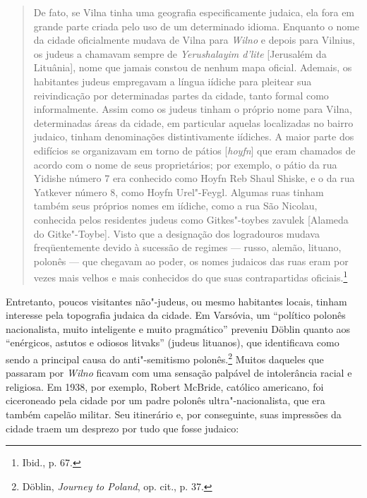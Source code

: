 \begin{quote}
De fato, se Vilna tinha uma geografia especificamente judaica, ela fora
em grande parte criada pelo uso de um determinado idioma. Enquanto o
nome da cidade oficialmente mudava de Vilna para \textit{Wilno} e depois para
Vilnius, os judeus a chamavam sempre de \textit{Yerushalayim d'lite}
{[}Jerusalém da Lituânia{]}, nome que jamais constou de nenhum mapa
oficial. Ademais, os habitantes judeus empregavam a língua iídiche para
pleitear sua reivindicação por determinadas partes da cidade, tanto
formal como informalmente. Assim como os judeus tinham o próprio nome
para Vilna, determinadas áreas da cidade, em particular aquelas
localizadas no bairro judaico, tinham denominações distintivamente
iídiches. A maior parte dos edifícios se organizavam em torno de pátios
{[}\textit{hoyfn}{]} que eram chamados de acordo com o nome de seus
proprietários; por exemplo, o pátio da rua Yidishe número 7 era
conhecido como Hoyfn Reb Shaul Shiske, e o da rua Yatkever número 8,
como Hoyfn Urel"-Feygl. Algumas ruas tinham também seus próprios nomes em
iídiche, como a rua São Nicolau, conhecida pelos residentes judeus como
Gitkes"-toybes zavulek {[}Alameda do Gitke"-Toybe{]}. Visto que a
designação dos logradouros mudava freqüentemente devido à sucessão de
regimes --- russo, alemão, lituano, polonês --- que chegavam ao poder, os
nomes judaicos das ruas eram por vezes mais velhos e mais conhecidos do
que suas contrapartidas oficiais.\footnote{Ibid., p. 67.}
\end{quote}

Entretanto, poucos visitantes não"-judeus, ou mesmo habitantes locais,
tinham interesse pela topografia judaica da cidade. Em Varsóvia, um
``político polonês nacionalista, muito inteligente e muito pragmático''
preveniu Döblin quanto aos ``enérgicos, astutos e odiosos litvaks''
(judeus lituanos), que identificava como sendo a principal causa do
anti"-semitismo polonês.\footnote{Döblin, \textit{Journey to Poland}, op. cit., p. 37.} Muitos daqueles que passaram por \textit{Wilno} ficavam com uma sensação palpável de intolerância racial e religiosa. Em 1938, por
exemplo, Robert McBride, católico americano, foi ciceroneado pela cidade
por um padre polonês ultra"-nacionalista, que era também capelão militar.
Seu itinerário e, por conseguinte, suas impressões da cidade traem um
desprezo por tudo que fosse judaico:

